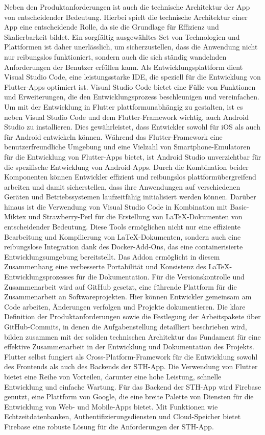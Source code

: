 Neben den Produktanforderungen ist auch die technische Architektur der App von entscheidender Bedeutung. Hierbei spielt die technische Architektur einer App eine entscheidende Rolle, da sie die Grundlage für Effizienz und Skalierbarkeit bildet.
Ein sorgfältig ausgewähltes Set von Technologien und Plattformen ist daher unerlässlich, um sicherzustellen, dass die Anwendung nicht nur reibungslos funktioniert, sondern auch die sich ständig wandelnden Anforderungen der Benutzer erfüllen kann.
Als Entwicklungsplattform dient Visual Studio Code, eine leistungsstarke IDE, die speziell für die Entwicklung von Flutter-Apps optimiert ist. Visual Studio Code bietet eine Fülle von Funktionen und Erweiterungen, die den Entwicklungsprozess beschleunigen und vereinfachen.
Um mit der Entwicklung in Flutter plattformunabhängig zu gestalten, ist es neben Visual Studio Code und dem Flutter-Framework wichtig, auch Android Studio zu installieren. Dies gewährleistet, dass Entwickler sowohl für iOS als auch für Android entwickeln können. Während das Flutter-Framework eine benutzerfreundliche Umgebung und eine Vielzahl von Smartphone-Emulatoren für die Entwicklung von Flutter-Apps bietet, ist Android Studio unverzichtbar für die spezifische Entwicklung von Android-Apps. Durch die Kombination beider Komponenten können Entwickler effizient und reibungslos plattformübergreifend arbeiten und damit sicherstellen, dass ihre Anwendungen auf verschiedenen Geräten und Betriebssystemen laufzeitfähig initialisiert werden können.
Darüber hinaus ist die Verwendung von Visual Studio Code in Kombination mit Basic-Miktex und Strawberry-Perl für die Erstellung von LaTeX-Dokumenten von entscheidender Bedeutung. Diese Tools ermöglichen nicht nur eine effiziente Bearbeitung und Kompilierung von LaTeX-Dokumenten, sondern auch eine reibungslose Integration dank des Docker-Add-Ons, das eine containerisierte Entwicklungsumgebung bereitstellt. Das Addon ermöglicht in diesem Zusammenhang eine verbesserte Portabilität und Konsistenz des LaTeX-Entwicklungsprozesses für die Dokumentation.
Für die Versionskontrolle und Zusammenarbeit wird auf GitHub gesetzt, eine führende Plattform für die Zusammenarbeit an Softwareprojekten. Hier können Entwickler gemeinsam am Code arbeiten, Änderungen verfolgen und Projekte dokumentieren.
Die klare Definition der Produktanforderungen sowie die Festlegung der Arbeitspakete über GitHub-Commits, in denen die Aufgabenstellung detailliert beschrieben wird, bilden zusammen mit der soliden technischen Architektur das Fundament für eine effektive Zusammenarbeit in der Entwicklung und Dokumentation des Projekts.
Flutter selbst fungiert als Cross-Platform-Framework für die Entwicklung sowohl des Frontends als auch des Backends der STH-App. Die Verwendung von Flutter bietet eine Reihe von Vorteilen, darunter eine hohe Leistung, schnelle Entwicklung und einfache Wartung.
Für das Backend der STH-App wird Firebase genutzt, eine Plattform von Google, die eine breite Palette von Diensten für die Entwicklung von Web- und Mobile-Apps bietet. Mit Funktionen wie Echtzeitdatenbanken, Authentifizierungsdiensten und Cloud-Speicher bietet Firebase eine robuste Lösung für die Anforderungen der STH-App.
